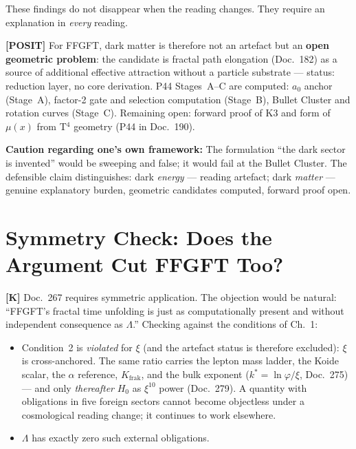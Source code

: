 \documentclass[11pt]{report}
\begin{document}
These findings do not disappear when the reading changes. They require
an explanation in \emph{every} reading.

\medskip
\noindent\textbf{[POSIT]} For FFGFT, dark matter is therefore not an
artefact but an \textbf{open geometric problem}: the candidate is
fractal path elongation (Doc.~182) as a source of additional effective
attraction without a particle substrate — status: reduction layer, no
core derivation. P44 Stages~A–C are computed: $a_0$ anchor (Stage~A),
factor-2 gate and selection computation (Stage~B), Bullet Cluster and
rotation curves (Stage~C). Remaining open: forward proof of K3 and
form of $\mu(x)$ from T$^4$ geometry (P44 in Doc.~190).

\medskip
\noindent\textbf{Caution regarding one's own framework:} The formulation
``the dark sector is invented'' would be sweeping and false; it would
fail at the Bullet Cluster. The defensible claim distinguishes: dark
\emph{energy} — reading artefact; dark \emph{matter} — genuine
explanatory burden, geometric candidates computed, forward proof open.

\chapter{Symmetry Check: Does the Argument Cut FFGFT Too?}

\textbf{[K]} Doc.~267 requires symmetric application. The objection
would be natural: ``FFGFT's fractal time unfolding is just as
computationally present and without independent consequence as
$\Lambda$.'' Checking against the conditions of Ch.~1:

\begin{itemize}
  \item Condition~2 is \emph{violated} for $\xi$ (and the artefact
        status is therefore excluded): $\xi$ is cross-anchored.
        The same ratio carries the lepton mass ladder, the Koide scalar,
        the $\alpha$ reference, $K_\text{frak}$, and the bulk exponent
        ($k^* = \ln\varphi/\xi$, Doc.~275) — and only \emph{thereafter}
        $H_0$ as $\xi^{10}$ power (Doc.~279). A quantity with obligations
        in five foreign sectors cannot become objectless under a
        cosmological reading change; it continues to work elsewhere.
  \item $\Lambda$ has exactly zero such external obligations.
\end{itemize}
\end{document}
